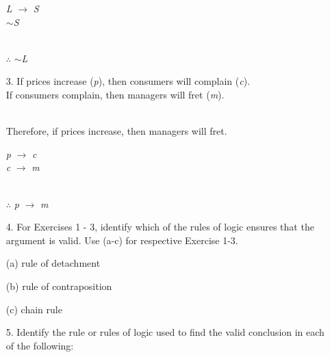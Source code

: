 \documentclass{article}
\begin{document}
\begin{itemize}
    \hspace*{1cm} {\color{blue} \emph{L} $\to$ \emph{S}}\\
    \hspace*{1cm} {\color{blue} $\sim$\emph{S}}\\
    \\
    \hspace*{1cm} {\color{blue} $\therefore$ $\sim$\emph{L}}
    
    \item[3.] If prices increase (\emph{p}), then consumers will complain (\emph{c}).\\
    If consumers complain, then managers will fret (\emph{m}).\\
    \\
    Therefore, if prices increase, then managers will fret.
    
    \hspace*{1cm} {\color{blue} \emph{p} $\to$ \emph{c}}\\
    \hspace*{1cm} {\color{blue} \emph{c} $\to$ \emph{m}}\\
    \\
    \hspace*{1cm} {\color{blue} $\therefore$ \emph{p} $\to$ \emph{m}}
    
    \item[4.] For Exercises 1 - 3, identify which of the rules of logic ensures that the argument is valid. Use (a-c) for respective Exercise 1-3.
    
    (a) {\color{blue} rule of detachment}
    
    (b) {\color{blue} rule of contraposition}
    
    (c) {\color{blue} chain rule}
    
    \item[5.] Identify the rule or rules of logic used to find the valid conclusion in each of the following:
    

\end{itemize}
\end{document}
